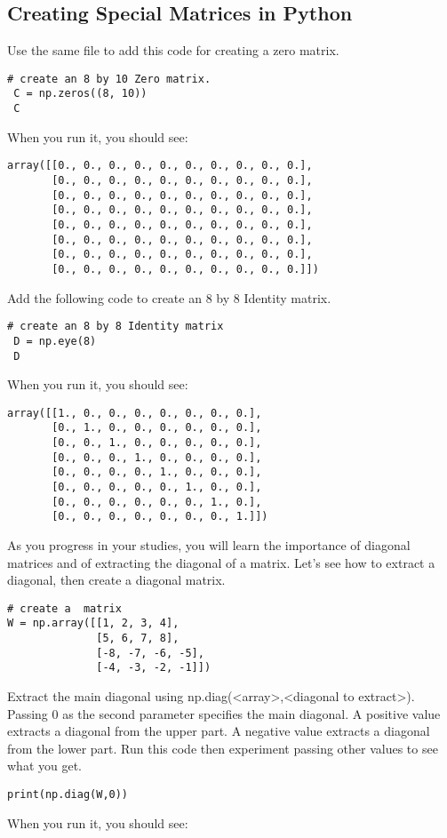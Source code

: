 \subsection{Creating Special Matrices in Python}
 Use the same file to add this code for creating a zero matrix.
\begin{Verbatim}
# create an 8 by 10 Zero matrix.
 C = np.zeros((8, 10))
 C
\end{Verbatim}
When you run it, you should see:
\begin{Verbatim}
array([[0., 0., 0., 0., 0., 0., 0., 0., 0., 0.],
       [0., 0., 0., 0., 0., 0., 0., 0., 0., 0.],
       [0., 0., 0., 0., 0., 0., 0., 0., 0., 0.],
       [0., 0., 0., 0., 0., 0., 0., 0., 0., 0.],
       [0., 0., 0., 0., 0., 0., 0., 0., 0., 0.],
       [0., 0., 0., 0., 0., 0., 0., 0., 0., 0.],
       [0., 0., 0., 0., 0., 0., 0., 0., 0., 0.],
       [0., 0., 0., 0., 0., 0., 0., 0., 0., 0.]])
\end{Verbatim}
Add the following code to create an 8 by 8 Identity matrix.
\begin{Verbatim}
# create an 8 by 8 Identity matrix 
 D = np.eye(8)
 D
\end{Verbatim}
When you run it, you should see:
\begin{Verbatim}
array([[1., 0., 0., 0., 0., 0., 0., 0.],
       [0., 1., 0., 0., 0., 0., 0., 0.],
       [0., 0., 1., 0., 0., 0., 0., 0.],
       [0., 0., 0., 1., 0., 0., 0., 0.],
       [0., 0., 0., 0., 1., 0., 0., 0.],
       [0., 0., 0., 0., 0., 1., 0., 0.],
       [0., 0., 0., 0., 0., 0., 1., 0.],
       [0., 0., 0., 0., 0., 0., 0., 1.]])
\end{Verbatim}
As you progress in your studies, you will learn the importance of diagonal matrices and of extracting the diagonal of a matrix. Let's see how to extract a diagonal, then create a diagonal matrix.
\begin{Verbatim}
# create a  matrix 
W = np.array([[1, 2, 3, 4], 
              [5, 6, 7, 8], 
              [-8, -7, -6, -5],
              [-4, -3, -2, -1]])
\end{Verbatim}
Extract the main diagonal using np.diag(<array>,<diagonal to extract>). 
Passing 0 as the second parameter specifies the main diagonal. A positive value extracts a diagonal from the upper part. A negative value extracts a diagonal from the lower part. Run this code then experiment passing other values to see what you get.
\begin{Verbatim}
print(np.diag(W,0))
\end{Verbatim}
When you run it, you should see:
